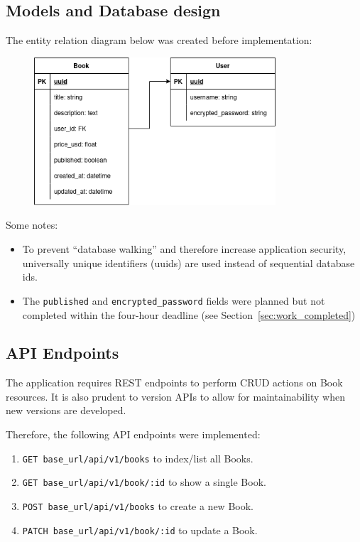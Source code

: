 \documentclass[a4paper]{article}
\begin{document}
\subsection{Models and Database design}
\label{sec:database}

The entity relation diagram below was created before implementation:

\begin{figure}[h]
  \begin{center}
    \includegraphics[width=9cm]{images/melio_database_design.png}
  \end{center}
\end{figure}

Some notes:

\begin{itemize}
  \item To prevent ``database walking'' and therefore increase application security,
  universally unique identifiers (uuids) are used instead of sequential database
  ids.
  \item The \texttt{published} and \texttt{encrypted\_password} fields were
  planned but not completed within the four-hour deadline (see
  Section~\ref{sec:work_completed})
\end{itemize}

\subsection{API Endpoints}
\label{sec:api}

The application requires REST endpoints to perform CRUD actions on Book resources.
It is also prudent to version APIs to allow for maintainability when new versions
are developed.

Therefore, the following API endpoints were implemented:

\begin{enumerate}
  \item \texttt{GET base\_url/api/v1/books} to index/list all Books.
  \item \texttt{GET base\_url/api/v1/book/:id} to show a single Book.
  \item \texttt{POST base\_url/api/v1/books} to create a new Book.
  \item \texttt{PATCH base\_url/api/v1/book/:id} to update a Book.
\end{enumerate}
\end{document}
